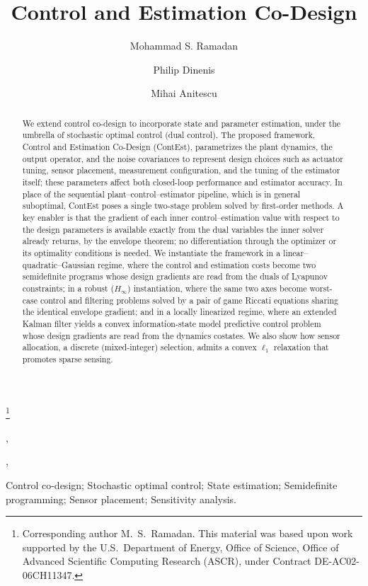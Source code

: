 \documentclass[twocolumn,amsthm]{autart}
\begin{document}
\begin{frontmatter}

\title{Control and Estimation Co-Design}

 \thanks[footnoteinfo]{Corresponding author M.~S.~Ramadan. This material was
 based upon work supported by the U.S.\ Department of Energy, Office of Science,
 Office of Advanced Scientific Computing Research (ASCR), under Contract
 DE-AC02-06CH11347.}

\author[anl]{Mohammad S. Ramadan},
\author[anl]{Philip Dinenis},
\author[anl]{Mihai Anitescu}

\address[anl]{Mathematics and Computer Science Division, Argonne National
Laboratory, Lemont, IL 60439, USA}

\begin{keyword}
Control co-design; Stochastic optimal control; State estimation;
Semidefinite programming; Sensor placement; Sensitivity analysis.
\end{keyword}

\begin{abstract}
We extend control co-design to incorporate state and parameter estimation,
under the umbrella of stochastic optimal control (dual control). The proposed
framework, Control and Estimation Co-Design (ContEst), parametrizes the plant
dynamics, the output operator, and the noise covariances to represent design
choices such as actuator tuning, sensor placement, measurement configuration, and
the tuning of the estimator itself; these parameters
affect both closed-loop performance and estimator accuracy. In place of the
sequential plant--control--estimator pipeline, which is in general suboptimal,
ContEst poses a single two-stage problem solved by first-order methods. A key
enabler is that the gradient of each inner control--estimation value with
respect to the design parameters is available exactly from the dual variables
the inner solver already returns, by the envelope theorem; no differentiation
through the optimizer or its optimality conditions is needed. We instantiate the
framework in a linear--quadratic--Gaussian regime, where the control and
estimation costs become two semidefinite programs whose design gradients are
read from the duals of Lyapunov constraints; in a robust ($H_\infty$)
instantiation, where the same two axes become worst-case control and filtering
problems solved by a pair of game Riccati equations sharing the identical
envelope gradient; and in a locally linearized regime, where an extended Kalman
filter yields a convex information-state model predictive control problem whose
design gradients are read from the dynamics costates. We also show how sensor
allocation, a discrete (mixed-integer) selection, admits a convex $\ell_1$
relaxation that promotes sparse sensing.
\end{abstract}

\end{frontmatter}
\end{document}
